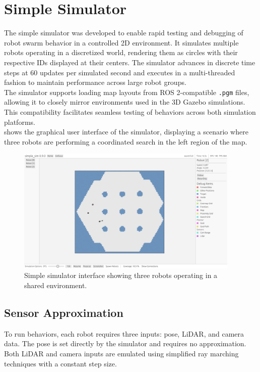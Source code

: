 \section{Simple Simulator}
\label{sec:simple-simulator}
The simple simulator was developed to enable rapid testing and debugging of robot swarm behavior in a controlled 2D environment. It simulates multiple robots operating in a discretized world, rendering them as circles with their respective IDs displayed at their centers. The simulator advances in discrete time steps at 60 updates per simulated second and executes in a multi-threaded fashion to maintain performance across large robot groups.\\

The simulator supports loading map layouts from ROS 2-compatible \texttt{.pgm} files, allowing it to closely mirror environments used in the 3D Gazebo simulations. This compatibility facilitates seamless testing of behaviors across both simulation platforms. \\

 shows the graphical user interface of the simulator, displaying a scenario where three robots are performing a coordinated search in the left region of the map.

\begin{figure}[H]
    \begin{center}
        \includegraphics[width=0.95\textwidth]{figures/screenshots/simple-sim-gui.png}
    \end{center}
    \caption{Simple simulator interface showing three robots operating in a shared environment.}
    \label{fig:simple-sim-interface}
\end{figure}

\subsection{Sensor Approximation}
To run behaviors, each robot requires three inputs: pose, LiDAR, and camera data. The pose is set directly by the simulator and requires no approximation. Both LiDAR and camera inputs are emulated using simplified ray marching techniques with a constant step size. \\

